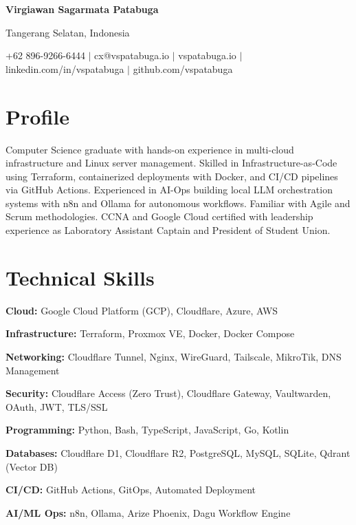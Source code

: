 \documentclass[11pt,a4paper]{article}
\newcommand{\cvname}[1]{%
    {\centering\fontsize{14pt}{16pt}\bfseries #1\par}
    \vspace{3pt}
}
\newcommand{\cvlocation}[1]{%
    {\centering\fontsize{11pt}{13pt}\selectfont #1\par}
    \vspace{4pt}
}
\newcommand{\cvcontact}[1]{%
    {\centering\fontsize{9.5pt}{11pt}\selectfont #1\par}
    \vspace{8pt}
}
\newcommand{\skillcat}[2]{%
    \textbf{#1:} #2
}
\begin{document}
\cvname{Virgiawan Sagarmata Patabuga}
\cvlocation{Tangerang Selatan, Indonesia}
\cvcontact{+62 896-9266-6444 $\vert$ cx@vspatabuga.io $\vert$ vspatabuga.io $\vert$ linkedin.com/in/vspatabuga $\vert$ github.com/vspatabuga}

\section*{Profile}

Computer Science graduate with hands-on experience in multi-cloud infrastructure and Linux server management. Skilled in Infrastructure-as-Code using Terraform, containerized deployments with Docker, and CI/CD pipelines via GitHub Actions. Experienced in AI-Ops building local LLM orchestration systems with n8n and Ollama for autonomous workflows. Familiar with Agile and Scrum methodologies. CCNA and Google Cloud certified with leadership experience as Laboratory Assistant Captain and President of Student Union.

\section*{Technical Skills}

\skillcat{Cloud}{Google Cloud Platform (GCP), Cloudflare, Azure, AWS}

\skillcat{Infrastructure}{Terraform, Proxmox VE, Docker, Docker Compose}

\skillcat{Networking}{Cloudflare Tunnel, Nginx, WireGuard, Tailscale, MikroTik, DNS Management}

\skillcat{Security}{Cloudflare Access (Zero Trust), Cloudflare Gateway, Vaultwarden, OAuth, JWT, TLS/SSL}

\skillcat{Programming}{Python, Bash, TypeScript, JavaScript, Go, Kotlin}

\skillcat{Databases}{Cloudflare D1, Cloudflare R2, PostgreSQL, MySQL, SQLite, Qdrant (Vector DB)}

\skillcat{CI/CD}{GitHub Actions, GitOps, Automated Deployment}

\skillcat{AI/ML Ops}{n8n, Ollama, Arize Phoenix, Dagu Workflow Engine}
\end{document}
